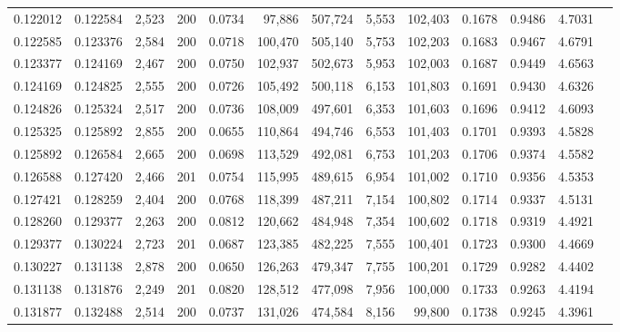 \begin{tabular}{rrrrrrrrrrrrr}
0.122012 & 0.122584 & 2,523 & 200 &                                     0.0734 &  97,886 & 507,724 &   5,553 & 102,403 & 0.1678 & 0.9486 & 4.7031 \\
0.122585 & 0.123376 & 2,584 & 200 &                                     0.0718 & 100,470 & 505,140 &   5,753 & 102,203 & 0.1683 & 0.9467 & 4.6791 \\
0.123377 & 0.124169 & 2,467 & 200 &                                     0.0750 & 102,937 & 502,673 &   5,953 & 102,003 & 0.1687 & 0.9449 & 4.6563 \\
0.124169 & 0.124825 & 2,555 & 200 &                                     0.0726 & 105,492 & 500,118 &   6,153 & 101,803 & 0.1691 & 0.9430 & 4.6326 \\
0.124826 & 0.125324 & 2,517 & 200 &                                     0.0736 & 108,009 & 497,601 &   6,353 & 101,603 & 0.1696 & 0.9412 & 4.6093 \\
0.125325 & 0.125892 & 2,855 & 200 &                                     0.0655 & 110,864 & 494,746 &   6,553 & 101,403 & 0.1701 & 0.9393 & 4.5828 \\
0.125892 & 0.126584 & 2,665 & 200 &                                     0.0698 & 113,529 & 492,081 &   6,753 & 101,203 & 0.1706 & 0.9374 & 4.5582 \\
0.126588 & 0.127420 & 2,466 & 201 &                                     0.0754 & 115,995 & 489,615 &   6,954 & 101,002 & 0.1710 & 0.9356 & 4.5353 \\
0.127421 & 0.128259 & 2,404 & 200 &                                     0.0768 & 118,399 & 487,211 &   7,154 & 100,802 & 0.1714 & 0.9337 & 4.5131 \\
0.128260 & 0.129377 & 2,263 & 200 &                                     0.0812 & 120,662 & 484,948 &   7,354 & 100,602 & 0.1718 & 0.9319 & 4.4921 \\
0.129377 & 0.130224 & 2,723 & 201 &                                     0.0687 & 123,385 & 482,225 &   7,555 & 100,401 & 0.1723 & 0.9300 & 4.4669 \\
0.130227 & 0.131138 & 2,878 & 200 &                                     0.0650 & 126,263 & 479,347 &   7,755 & 100,201 & 0.1729 & 0.9282 & 4.4402 \\
0.131138 & 0.131876 & 2,249 & 201 &                                     0.0820 & 128,512 & 477,098 &   7,956 & 100,000 & 0.1733 & 0.9263 & 4.4194 \\
0.131877 & 0.132488 & 2,514 & 200 &                                     0.0737 & 131,026 & 474,584 &   8,156 &  99,800 & 0.1738 & 0.9245 & 4.3961 \\

\end{tabular}

